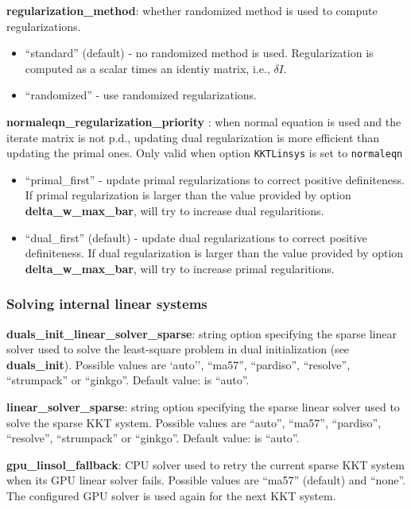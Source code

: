 \noindent \textbf{regularization\_method}: whether randomized method is used to compute regularizations.
\begin{itemize}
\item ``standard'' (default) - no randomized method is used. Regularization is computed as a scalar times an identiy matrix, i.e., $\delta I$.
\item ``randomized'' - use randomized regularizations.
\end{itemize}
\medskip

\noindent \textbf{normaleqn\_regularization\_priority }: when normal equation is used and the iterate matrix is not p.d., updating dual regularization is more efficient than updating the primal ones. Only valid when option \texttt{KKTLinsys} is set to \texttt{normaleqn}
\begin{itemize}
\item ``primal\_first'' - update primal regularizations to correct positive definiteness. If primal regularization is larger than the value provided by option \textbf{delta\_w\_max\_bar}, \Hi will try to increase dual regularitions. 
\item ``dual\_first'' (default) - update dual regularizations to correct positive definiteness. If dual regularization is larger than the value provided by option \textbf{delta\_w\_max\_bar}, \Hi will try to increase primal regularitions. 
\end{itemize}
\medskip



\subsubsection{Solving internal linear systems}

\noindent \textbf{duals\_init\_linear\_solver\_sparse}: string option specifying the sparse linear solver used to solve the least-square problem in dual initialization (see \textbf{duals\_init}). Possible values are `auto'', ``ma57'', ``pardiso'', ``resolve'', ``strumpack'' or ``ginkgo''. Default value: is ``auto''.
\medskip

\noindent \textbf{linear\_solver\_sparse}: string option specifying the sparse linear solver used to solve the sparse KKT system. Possible values are ``auto'', ``ma57'', ``pardiso'', ``resolve'', ``strumpack'' or ``ginkgo''. Default value: is ``auto''.
\medskip

\noindent \textbf{gpu\_linsol\_fallback}: CPU solver used to retry the current sparse KKT system when its GPU linear solver fails. Possible values are ``ma57'' (default) and ``none''. The configured GPU solver is used again for the next KKT system.
\medskip

